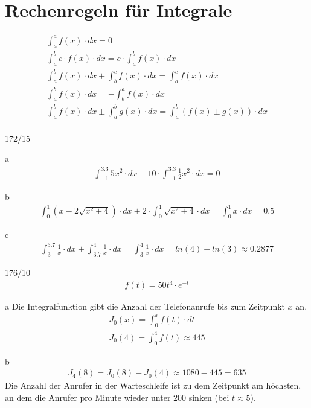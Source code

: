 \section{Rechenregeln für Integrale}
\begin{gather*}
  \int_a^a f(x) \cdot dx = 0 \\
  \int_a^b c \cdot f(x) \cdot dx = c \cdot \int_a^b f(x) \cdot dx \\
  \int_a^b f(x) \cdot dx + \int_b^c f(x) \cdot dx = \int_a^c f(x) \cdot dx \\
  \int_a^b f(x) \cdot dx = -\int_b^a f(x) \cdot dx \\
  \int_a^b f(x) \cdot dx \pm \int_a^b g(x) \cdot dx = \int_a^b (f(x) \pm g(x)) \cdot dx \\
\end{gather*}
\begin{exercise}{172/15}
  \item [a]
    \begin{gather*}
      \int_{-1}^{3.3} 5x^2 \cdot dx - 10 \cdot \int_{-1}^{3.3} \frac{1}{2}x^2 \cdot dx = 0
    \end{gather*}
  \item [b]
    \begin{gather*}
      \int_0^1 (x - 2\sqrt{x^2 + 4}) \cdot dx + 2 \cdot \int_0^1 \sqrt{x^2 + 4} \cdot dx = \int_0^1 x \cdot dx = 0.5
    \end{gather*}
  \item [c]
    \begin{gather*}
      \int_3^{3.7} \frac{1}{x} \cdot dx + \int_{3.7}^{4} \frac{1}{x} \cdot dx = \int_3^4 \frac{1}{x} \cdot dx = ln(4) - ln(3) \approx 0.2877
    \end{gather*}
\end{exercise}
\begin{exercise}{176/10}
  \begin{gather*}
    f(t) = 50t^4 \cdot e^{-t}
  \end{gather*}
  \item [a]
  Die Integralfunktion gibt die Anzahl der Telefonanrufe bis zum Zeitpunkt $x$ an.
  \begin{gather*}
    J_0(x) = \int_0^x f(t) \cdot dt \\
    J_0(4) = \int_0^4 f(t) \approx 445
  \end{gather*}
  \item [b]
  \begin{gather*}
    J_4(8) = J_0(8) - J_0(4) \approx 1080 - 445 = 635
  \end{gather*}
  Die Anzahl der Anrufer in der Warteschleife ist zu dem Zeitpunkt am höchsten, an dem die Anrufer pro Minute wieder unter $200$ sinken (bei $t \approx 5$).
\end{exercise}
